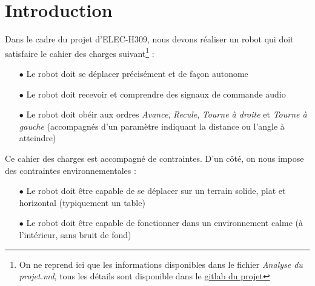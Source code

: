 \documentclass[12pt,a4paper]{ULBReport} %
\begin{document}

\chapter{Introduction}

Dans le cadre du projet d'ELEC-H309, nous devons réaliser un robot qui doit satisfaire le cahier des charges suivant\footnote{On ne reprend ici que les informations disponibles dans le fichier \textit{Analyse du projet.md}, tous les détails sont disponible dans le \href{https://gitlab.com/mosee/elech309-2024}{gitlab du projet} } :
\begin{enumerate}
    \item[$\bullet$] Le robot doit se déplacer précisément et de façon autonome
    \item[$\bullet$] Le robot doit recevoir et comprendre des signaux de commande audio
    \item[$\bullet$] Le robot doit obéir aux ordres \textit{Avance}, \textit{Recule}, \textit{Tourne à droite} et \textit{Tourne à gauche} (accompagnés d'un paramètre indiquant la distance ou l'angle à atteindre)
\end{enumerate}

Ce cahier des charges est accompagné de contraintes. D'un côté, on nous impose des contraintes environnementales : 

\begin{enumerate}
    \item[$\bullet$] Le robot doit être capable de se déplacer sur un terrain solide, plat et horizontal (typiquement un table)
    \item[$\bullet$] Le robot doit être capable de fonctionner dans un environnement calme (à l'intérieur, sans bruit de fond)
\end{enumerate}
\end{document}
